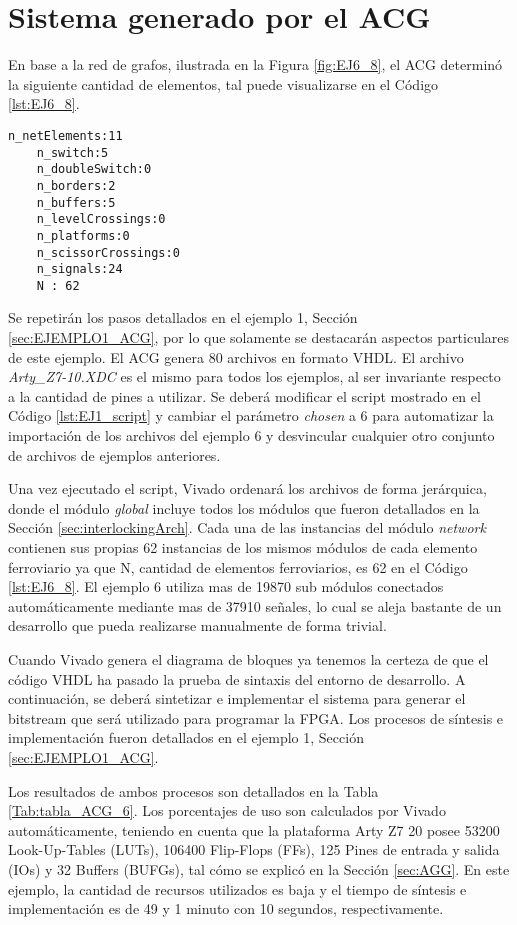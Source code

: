 \section{Sistema generado por el ACG}
	
	En base a la red de grafos, ilustrada en la Figura \ref{fig:EJ6_8}, el ACG determinó la siguiente cantidad de elementos, tal puede visualizarse en el Código \ref{lst:EJ6_8}.
	
	\begin{lstlisting}[language = {}, caption = Cantidad de elementos a implementar por el ACG, label = {lst:EJ6_8}]
	n_netElements:11
	n_switch:5
	n_doubleSwitch:0
	n_borders:2
	n_buffers:5
	n_levelCrossings:0
	n_platforms:0
	n_scissorCrossings:0
	n_signals:24
	N : 62
	\end{lstlisting}
	
	Se repetirán los pasos detallados en el ejemplo 1, Sección \ref{sec:EJEMPLO1_ACG}, por lo que solamente se destacarán aspectos particulares de este ejemplo. El ACG genera 80 archivos en formato VHDL. El archivo \textit{Arty\_Z7-10.XDC} es el mismo para todos los ejemplos, al ser invariante respecto a la cantidad de pines a utilizar. Se deberá modificar el script mostrado en el Código \ref{lst:EJ1_script} y cambiar el parámetro \textit{chosen} a 6 para automatizar la importación de los archivos del ejemplo 6 y desvincular cualquier otro conjunto de archivos de ejemplos anteriores.
	
	Una vez ejecutado el script, Vivado ordenará los archivos de forma jerárquica, donde el módulo \textit{global} incluye todos los módulos que fueron detallados en la Sección \ref{sec:interlockingArch}. Cada una de las instancias del módulo \textit{network} contienen sus propias 62 instancias de los mismos módulos de cada elemento ferroviario ya que N, cantidad de elementos ferroviarios, es 62 en el Código \ref{lst:EJ6_8}. El ejemplo 6 utiliza mas de 19870 sub módulos conectados automáticamente mediante mas de 37910 señales, lo cual se aleja bastante de un desarrollo que pueda realizarse manualmente de forma trivial.
	
	Cuando Vivado genera el diagrama de bloques ya tenemos la certeza de que el código VHDL ha pasado la prueba de sintaxis del entorno de desarrollo. A continuación, se deberá sintetizar e implementar el sistema para generar el bitstream que será utilizado para programar la FPGA. Los procesos de síntesis e implementación fueron detallados en el ejemplo 1, Sección \ref{sec:EJEMPLO1_ACG}.
	
	Los resultados de ambos procesos son detallados en la Tabla \ref{Tab:tabla_ACG_6}. Los porcentajes de uso son calculados por Vivado automáticamente, teniendo en cuenta que la plataforma Arty Z7 20 posee 53200 Look-Up-Tables (LUTs), 106400 Flip-Flops (FFs), 125 Pines de entrada y salida (IOs) y 32 Buffers (BUFGs), tal cómo se explicó en la Sección \ref{sec:AGG}. En este ejemplo, la cantidad de recursos utilizados es baja y el tiempo de síntesis e implementación es de 49 y 1 minuto con 10 segundos, respectivamente.
	
